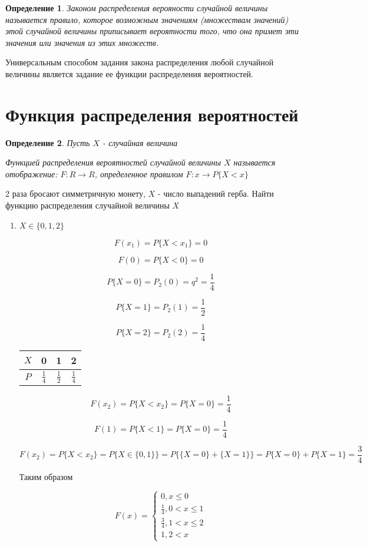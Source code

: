 \documentclass[a4paper, 14pt]{report}
\newtheorem{defenition}{Определение}[section]
\begin{document}
\begin{defenition}
    Законом распределения верояности случайной величины называется правило, которое возможным значениям (множествам значений) этой случайной величины приписывает вероятности того, что она примет эти значения или значения из этих множеств.
\end{defenition}

Универсальным способом задания закона распределения любой случайной величины является задание ее функции распределения вероятностей.

\section{Функция распределения вероятностей}

\begin{defenition}
    Пусть $X$ - случайная величина

    Функцией распределения вероятностей случайной величины $X$ называется отображение: $F: R \to R$, определенное правилом $F: x \to P\{X < x\}$
\end{defenition}

2 раза бросают симметричную монету, $X$ - число выпадений герба. Найти функцию распределения случайной величины $X$

\begin{enumerate}
    \item $X \in \{0,1,2\}$

        $$F(x_1) = P\{X < x_1\} = 0$$

        $$F(0) = P\{X < 0\} = 0$$

        $$P\{X=0\} = P_2(0) = q^2 = \frac{1}{4}$$

        $$P\{X=1\} = P_2(1) = \frac{1}{2}$$

        $$P\{X=2\} = P_2(2) = \frac{1}{4}$$

        \begin{tabular}{|c||c|c|c|}
            \hline
            $X$ & 0 & 1 & 2 \\
            \hline
            $P$ & $\frac{1}{4}$ & $\frac{1}{2}$ & $\frac{1}{4}$ \\
            \hline
        \end{tabular}

        $$
        F(x_2) = P\{X<x_2\} = P\{X=0\} = \frac{1}{4}
        $$

        $$
        F(1) =  P\{X<1\} = P\{X=0\} = \frac{1}{4}
        $$

        $$
        F(x_2) =  P\{X<x_2\} = P\{X\in\{0,1\}\} = P\big\{ \{X=0\} + \{X=1\} \big\} = P\{X=0\} + P\{X=1\} = \frac{3}{4}
        $$

        Таким образом

        $$
        F(x) =
        \begin{cases}
            0, x \le 0 \\
            \frac{1}{4}, 0 < x \le 1 \\
            \frac{3}{4}, 1 < x \le 2 \\
            1, 2 < x
        \end{cases}
        $$
\end{enumerate}
\end{document}
